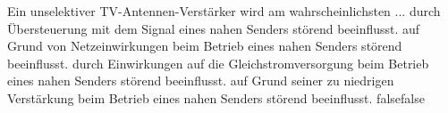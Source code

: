     {Ein unselektiver TV-Antennen-Verstärker wird am wahrscheinlichsten ...}
    {durch Übersteuerung mit dem Signal eines nahen Senders störend beeinflusst.}
    {auf Grund von Netzeinwirkungen beim Betrieb eines nahen Senders störend beeinflusst.}
    {durch Einwirkungen auf die Gleichstromversorgung beim Betrieb eines nahen Senders störend beeinflusst.}
    {auf Grund seiner zu niedrigen Verstärkung beim Betrieb eines nahen Senders störend beeinflusst.}
    {false}{false}